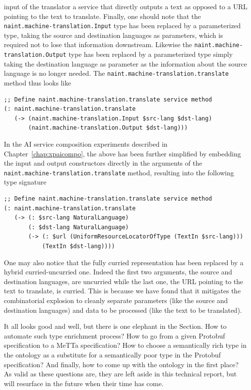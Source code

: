 \documentclass[]{report}
\begin{document}
input of the translator a service that directly outputs a text as
opposed to a URL pointing to the text to translate.  Finally, one
should note that the
\texttt{naint.machine-translation.Input} type has been
replaced by a parameterized type, taking the source and destination
languages as parameters, which is required not to lose that
information downstream.  Likewise the
\texttt{naint.machine-translation.Output} type has been
replaced by a parameterized type simply taking the destination
language as parameter as the information about the source language is
no longer needed.  The
\texttt{naint.machine-translation.translate} method thus
looks like
\begin{verbatim}
;; Define naint.machine-translation.translate service method
(: naint.machine-translation.translate
   (-> (naint.machine-translation.Input $src-lang $dst-lang)
       (naint.machine-translation.Output $dst-lang)))
\end{verbatim}
In the AI service composition experiments described in
Chapter~\ref{chap:xpaicompo}, the above has been further simplified by
embedding the input and output constructors directly in the arguments
of the \texttt{naint.machine-translation.translate}
method, resulting into the following type signature
\begin{small}
\begin{verbatim}
;; Define naint.machine-translation.translate service method
(: naint.machine-translation.translate
   (-> (: $src-lang NaturalLanguage)
       (: $dst-lang NaturalLanguage)
       (-> (: $url (UniformResourceLocatorOfType (TextIn $src-lang)))
           (TextIn $dst-lang))))
\end{verbatim}
\end{small}
One may also notice that the fully curried representation has been
replaced by a hybrid curried-uncurried one.  Indeed the first two
arguments, the source and destination languages, are uncurried while
the last one, the URL pointing to the text to translate, is curried.
This is because we have found that it mitigates the combinatorial
explosion to cleanly separate parameters (like the source and
destination languages) and data to be processed (like the text to be
translated).

It all looks good and well, but there is one elephant in the Section.
How to automate such type enrichment process?  How to go from a given
Protobuf specification to a MeTTa specification?  How to choose a
semantically rich type in the ontology as a substitute for a
semantically poor type in the Protobuf specification?  And finally,
how to come up with the ontology in the first place?  As valid as
these questions are, they are left aside in this technical report, but
will resurface in the future when their time has come.
\end{document}
